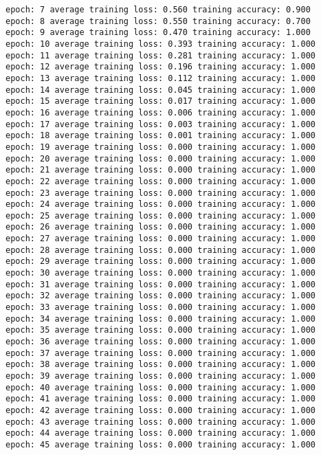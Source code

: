 \documentclass[10pt]{article}
\begin{document}
    \begin{Verbatim}[commandchars=\\\{\}]
epoch: 7 average training loss: 0.560 training accuracy: 0.900
epoch: 8 average training loss: 0.550 training accuracy: 0.700
epoch: 9 average training loss: 0.470 training accuracy: 1.000
epoch: 10 average training loss: 0.393 training accuracy: 1.000
epoch: 11 average training loss: 0.281 training accuracy: 1.000
epoch: 12 average training loss: 0.196 training accuracy: 1.000
epoch: 13 average training loss: 0.112 training accuracy: 1.000
epoch: 14 average training loss: 0.045 training accuracy: 1.000
epoch: 15 average training loss: 0.017 training accuracy: 1.000
epoch: 16 average training loss: 0.006 training accuracy: 1.000
epoch: 17 average training loss: 0.003 training accuracy: 1.000
epoch: 18 average training loss: 0.001 training accuracy: 1.000
epoch: 19 average training loss: 0.000 training accuracy: 1.000
epoch: 20 average training loss: 0.000 training accuracy: 1.000
epoch: 21 average training loss: 0.000 training accuracy: 1.000
epoch: 22 average training loss: 0.000 training accuracy: 1.000
epoch: 23 average training loss: 0.000 training accuracy: 1.000
epoch: 24 average training loss: 0.000 training accuracy: 1.000
epoch: 25 average training loss: 0.000 training accuracy: 1.000
epoch: 26 average training loss: 0.000 training accuracy: 1.000
epoch: 27 average training loss: 0.000 training accuracy: 1.000
epoch: 28 average training loss: 0.000 training accuracy: 1.000
epoch: 29 average training loss: 0.000 training accuracy: 1.000
epoch: 30 average training loss: 0.000 training accuracy: 1.000
epoch: 31 average training loss: 0.000 training accuracy: 1.000
epoch: 32 average training loss: 0.000 training accuracy: 1.000
epoch: 33 average training loss: 0.000 training accuracy: 1.000
epoch: 34 average training loss: 0.000 training accuracy: 1.000
epoch: 35 average training loss: 0.000 training accuracy: 1.000
epoch: 36 average training loss: 0.000 training accuracy: 1.000
epoch: 37 average training loss: 0.000 training accuracy: 1.000
epoch: 38 average training loss: 0.000 training accuracy: 1.000
epoch: 39 average training loss: 0.000 training accuracy: 1.000
epoch: 40 average training loss: 0.000 training accuracy: 1.000
epoch: 41 average training loss: 0.000 training accuracy: 1.000
epoch: 42 average training loss: 0.000 training accuracy: 1.000
epoch: 43 average training loss: 0.000 training accuracy: 1.000
epoch: 44 average training loss: 0.000 training accuracy: 1.000
epoch: 45 average training loss: 0.000 training accuracy: 1.000

\end{Verbatim}
\end{document}
